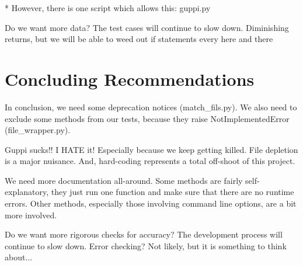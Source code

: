 \documentclass[12pt]{article}
\begin{document}
    * However, there is one script which allows this: guppi.py

Do we want more data? The test cases will continue to slow down. Diminishing returns,
	but we will be able to weed out if statements every here and there

\section{Concluding Recommendations}

\quad \quad In conclusion, we need some deprecation notices (match\_fils.py). We also need to exclude some methods from our tests, because they raise NotImplementedError (file\_wrapper.py).

Guppi sucks!! I HATE it! Especially because we keep getting killed. File depletion is a major nuisance. And, hard-coding represents a total off-shoot of this project.

We need more documentation all-around. Some methods are fairly self-explanatory, they just run one function and make sure that there are no runtime errors. Other methods, especially those involving command line options, are a bit more involved.

Do we want more rigorous checks for accuracy? The development process will continue to slow down.
Error checking? Not likely, but it is something to think about...
\end{document}
